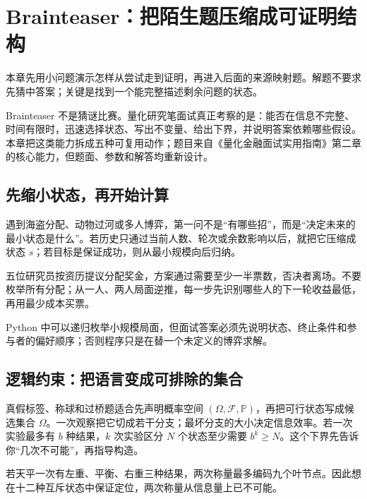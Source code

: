 \chapter{Brainteaser：把陌生题压缩成可证明结构}
\label{ch:lower-brainteasers}

\begin{itemize}
  
\end{itemize}

本章先用小问题演示怎样从尝试走到证明，再进入后面的来源映射题。解题不要求先猜中答案；关键是找到一个能完整描述剩余问题的状态。


Brainteaser 不是猜谜比赛。量化研究笔面试真正考察的是：能否在信息不完整、时间有限时，迅速选择状态、写出不变量、给出下界，并说明答案依赖哪些假设。本章把这类能力拆成五种可复用动作；题目来自《量化金融面试实用指南》第二章的核心能力，但题面、参数和解答均重新设计。

\section{先缩小状态，再开始计算}

遇到海盗分配、动物过河或多人博弈，第一问不是“有哪些招”，而是“决定未来的最小状态是什么”。若历史只通过当前人数、轮次或余数影响以后，就把它压缩成状态 $s$；若目标是保证成功，则从最小规模向后归纳。

\begin{example}
五位研究员按资历提议分配奖金，方案通过需要至少一半票数，否决者离场。不要枚举所有分配；从一人、两人局面逆推，每一步先识别哪些人的下一轮收益最低，再用最少成本买票。
\end{example}

Python 中可以递归枚举小规模局面，但面试答案必须先说明状态、终止条件和参与者的偏好顺序；否则程序只是在替一个未定义的博弈求解。

\section{逻辑约束：把语言变成可排除的集合}

真假标签、称球和过桥题适合先声明概率空间 $(\Omega,\mathcal F,\mathbb P)$，再把可行状态写成候选集合 $\Omega$。一次观察把它切成若干分支；最坏分支的大小决定信息效率。若一次实验最多有 $b$ 种结果，$k$ 次实验区分 $N$ 个状态至少需要 $b^k\ge N$。这个下界先告诉你“几次不可能”，再指导构造。

\begin{example}
若天平一次有左重、平衡、右重三种结果，两次称量最多编码九个叶节点。因此想在十二种互斥状态中保证定位，两次称量从信息量上已不可能。
\end{example}

